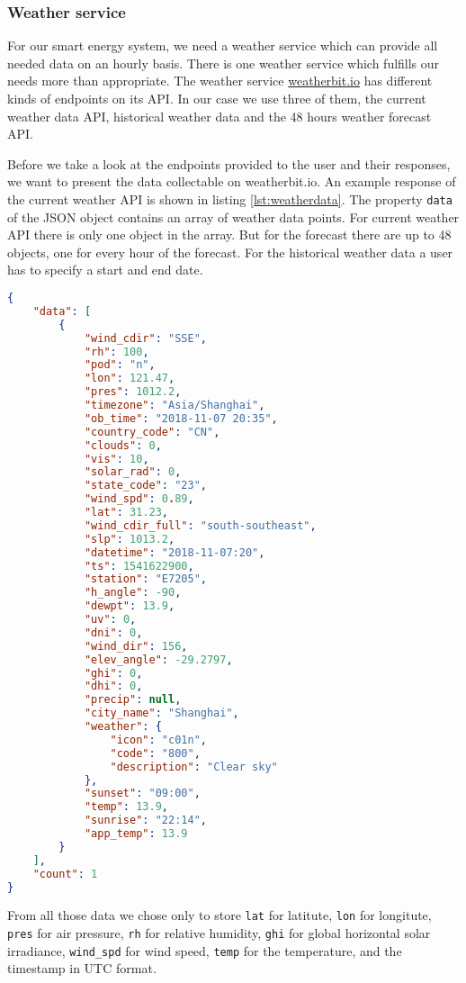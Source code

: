 \subsubsection{Weather service}\label{sec:weatherservice}
For our smart energy system, we need a weather service which can provide all needed data on an hourly basis.
There is one weather service which fulfills our needs more than appropriate.
The weather service \url{weatherbit.io} has different kinds of endpoints on its API.
In our case we use three of them, the current weather data API, historical weather data and the 48 hours weather forecast API.

Before we take a look at the endpoints provided to the user and their responses, we want to present the data collectable on weatherbit.io.
An example response of the current weather API is shown in listing \ref{lst:weatherdata}.
The property  \texttt{data} of the JSON object contains an array of weather data points.
For current weather API there is only one object in the array.
But for the forecast there are up to 48 objects, one for every hour of the forecast.
For the historical weather data a user has to specify a start and end date. 
\begin{lstlisting}[caption={Example response of weatherbit.io for $lat=31.23$ and $lon=121.47$}, label={lst:weatherdata}, frame=single, language=json]
 {
    "data": [
        {
            "wind_cdir": "SSE",
            "rh": 100,
            "pod": "n",
            "lon": 121.47,
            "pres": 1012.2,
            "timezone": "Asia/Shanghai",
            "ob_time": "2018-11-07 20:35",
            "country_code": "CN",
            "clouds": 0,
            "vis": 10,
            "solar_rad": 0,
            "state_code": "23",
            "wind_spd": 0.89,
            "lat": 31.23,
            "wind_cdir_full": "south-southeast",
            "slp": 1013.2,
            "datetime": "2018-11-07:20",
            "ts": 1541622900,
            "station": "E7205",
            "h_angle": -90,
            "dewpt": 13.9,
            "uv": 0,
            "dni": 0,
            "wind_dir": 156,
            "elev_angle": -29.2797,
            "ghi": 0,
            "dhi": 0,
            "precip": null,
            "city_name": "Shanghai",
            "weather": {
                "icon": "c01n",
                "code": "800",
                "description": "Clear sky"
            },
            "sunset": "09:00",
            "temp": 13.9,
            "sunrise": "22:14",
            "app_temp": 13.9
        }
    ],
    "count": 1
}
\end{lstlisting}
From all those data we chose only to store \texttt{lat} for latitute, \texttt{lon} for longitute, \texttt{pres} for air pressure, \texttt{rh} for relative humidity, \texttt{ghi} for global horizontal solar irradiance, \texttt{wind\_spd} for wind speed, \texttt{temp} for the temperature, and the timestamp in UTC format.


